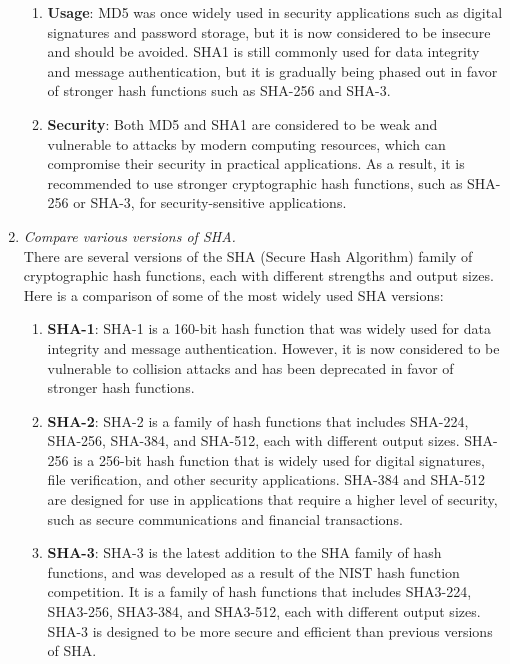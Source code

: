 \documentclass[openany]{book}
\begin{document}
\begin{enumerate}
\begin{enumerate}
              \item \textbf{Usage}: MD5 was once widely used in security applications such as digital signatures and password storage, but it is now considered to be insecure and should be avoided. SHA1 is still commonly used for data integrity and message authentication, but it is gradually being phased out in favor of stronger hash functions such as SHA-256 and SHA-3.

              \item \textbf{Security}: Both MD5 and SHA1 are considered to be weak and vulnerable to attacks by modern computing resources, which can compromise their security in practical applications. As a result, it is recommended to use stronger cryptographic hash functions, such as SHA-256 or SHA-3, for security-sensitive applications.
          \end{enumerate}

    \item \textit{Compare various versions of SHA.} \\

          There are several versions of the SHA (Secure Hash Algorithm) family of cryptographic hash functions, each with different strengths and output sizes. Here is a comparison of some of the most widely used SHA versions:

          \begin{enumerate}
              \item \textbf{SHA-1}: SHA-1 is a 160-bit hash function that was widely used for data integrity and message authentication. However, it is now considered to be vulnerable to collision attacks and has been deprecated in favor of stronger hash functions.

              \item \textbf{SHA-2}: SHA-2 is a family of hash functions that includes SHA-224, SHA-256, SHA-384, and SHA-512, each with different output sizes. SHA-256 is a 256-bit hash function that is widely used for digital signatures, file verification, and other security applications. SHA-384 and SHA-512 are designed for use in applications that require a higher level of security, such as secure communications and financial transactions.

              \item \textbf{SHA-3}: SHA-3 is the latest addition to the SHA family of hash functions, and was developed as a result of the NIST hash function competition. It is a family of hash functions that includes SHA3-224, SHA3-256, SHA3-384, and SHA3-512, each with different output sizes. SHA-3 is designed to be more secure and efficient than previous versions of SHA.


\end{enumerate}
\end{enumerate}
\end{document}
